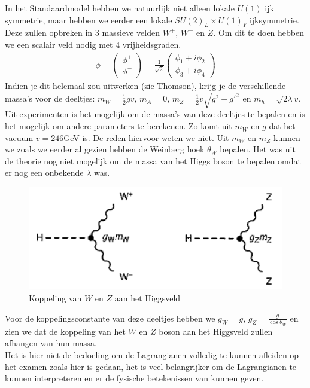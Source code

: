 \documentclass[../main.tex]{subfiles}
\begin{document}
In het Standaardmodel hebben we natuurlijk niet alleen lokale $U(1)$ ijk symmetrie, maar hebben we eerder een lokale $SU(2)_L\times U(1)_Y$ ijksymmetrie. Deze zullen opbreken in 3 massieve velden $W^+$, $W^-$ en $Z$. Om dit te doen hebben we een scalair veld nodig met 4 vrijheidsgraden.
\begin{equation}
    \begin{aligned}
        \label{eq:sm_scalair_veld}
        \phi = 
        \begin{pmatrix}
            \phi^+\\
            \phi^-
        \end{pmatrix}
        = \frac{1}{\sqrt{2}} 
        \begin{pmatrix}
            \phi_1 + i\phi_2\\
            \phi_3 + i\phi_4
        \end{pmatrix}
    \end{aligned}
\end{equation}
Indien je dit helemaal zou uitwerken (zie Thomson), krijg je de verschillende massa's voor de deeltjes: $m_W = \frac{1}{2} gv$, $m_A = 0$, $m_Z = \frac{1}{2} v\sqrt{g^2+g'^2}$ en $m_h = \sqrt{2\lambda}v$. Uit experimenten is het mogelijk om de massa's van deze deeltjes te bepalen en is het mogelijk om andere parameters te berekenen. Zo komt uit $m_W$ en $g$ dat het vacuum $v=246$GeV is. De reden hiervoor weten we niet. Uit $m_W$ en $m_Z$ kunnen we zoals we eerder al gezien hebben de Weinberg hoek $\theta_W$ bepalen. Het was uit de theorie nog niet mogelijk om de massa van het Higgs boson te bepalen omdat er nog een onbekende $\lambda$ was.

\begin{figure}[h]
    \centering
    \includegraphics[width=0.6\linewidth]{higgs_boson/koppeling_higgs_wz_boson.png}
    \caption{Koppeling van $W$ en $Z$ aan het Higgsveld}%
    \label{fig:higgs_boson/koppeling_higgs_wz_boson}
\end{figure}

Voor de koppelingsconstante van deze deeltjes hebben we $g_W=g$, $g_Z= \frac{g}{\cos\theta_W}$ en zien we dat de koppeling van het $W$ en $Z$ boson aan het Higgsveld zullen afhangen van hun massa.\\
{\color{red} Het is hier niet de bedoeling om de Lagrangianen volledig te kunnen afleiden op het examen zoals hier is gedaan, het is veel belangrijker om de Lagrangianen te kunnen interpreteren en er de fysische betekenissen van kunnen geven.}
\end{document}
